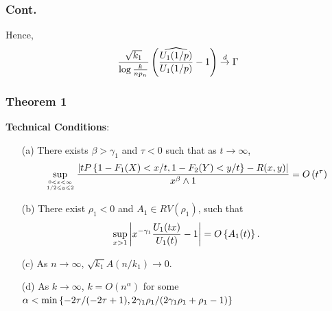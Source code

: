 \documentclass{beamer}
\begin{document}
\begin{frame}
    \frametitle{Cont.}
Hence,
$$
\frac{\sqrt{k_1}}{\log\frac{k}{np_n} }\left(\frac{\widehat{U_1(1/p)}}{U_1(1/p)} -1\right)\stackrel{d}{\to} \Gamma
$$
\end{frame}
 

\begin{frame}
    \frametitle{Theorem 1}


{\bf Technical Conditions}:
\begin{itemize}
    \item[(a)] There exists $\beta>\gamma_1$ and $\tau<0$ such that as $t\to\infty$,
    $$
    \sup _{0<x<\infty \atop 1 / 2 \leqslant y \leqslant 2} \frac{\left|t P\left\{1-F_{1}(X)<x / t, 1-F_{2}(Y)<y / t\right\}-R(x, y)\right|}{x^{\beta} \wedge 1}=O\left(t^{\tau}\right)
    $$ 
    \item[(b)] There exist $\rho_1<0$ and $A_1\in RV(\rho_1)$, such that 
    $$
        \sup_{x>1}\left\vert x^{-\gamma_1}\frac{U_1(tx)}{U_1(t)}-1\right\vert =O\left\{A_1(t)\right\}.
    $$
    \item[(c)] As $n\to\infty$, $\sqrt{k_1}A(n/k_1) \to 0$.
    \item[(d)] As $k\to \infty$, $k=O(n^{\alpha})$ for some $\alpha <\min\left\{-2\tau/(-2\tau+1),2\gamma_1\rho_1/(2\gamma_1\rho_1+\rho_1-1)\right\}$ 
\end{itemize}
\end{frame}
\end{document}
